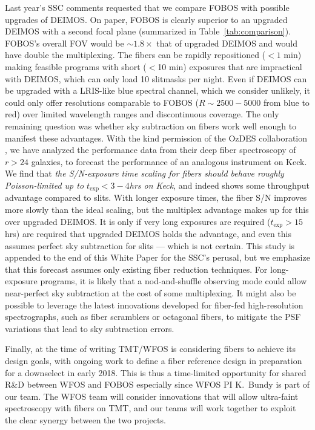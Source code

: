 \documentclass[10pt,letterpaper]{article}
\newcommand{\texp}{\ensuremath{t_\mathrm{exp}}}
\begin{document}
Last year's SSC comments requested that we compare FOBOS with possible upgrades
of DEIMOS. 
On paper, FOBOS is clearly superior to an upgraded DEIMOS with a second focal plane (summarized in Table~\ref{tab:comparison}).
FOBOS's overall FOV would be $\sim 1.8\times$ that of upgraded DEIMOS and would have double the
multiplexing. 
The fibers can be rapidly repositioned ($<1$ min) making feasible programs with short ($<$10 min) 
exposures that are impractical with DEIMOS, which can only load 10 slitmasks per night. 
Even if DEIMOS can be upgraded with a LRIS-like blue spectral channel, which we consider unlikely, 
it could only offer resolutions comparable to FOBOS 
($R\sim 2500-5000$ from blue to red) over limited wavelength ranges and discontinuous coverage.
The only remaining question was whether sky subtraction on fibers work well enough
 to manifest these advantages. With the kind permission of the OzDES collaboration \cite{yuan:2015}, we have analyzed the
 performance data from their deep fiber spectroscopy of $r>24$ galaxies, to forecast the performance of an analogous 
 instrument on Keck. We find that \emph{the S/N-exposure time scaling for fibers should behave roughly Poisson-limited up to 
 $\texp < 3-4$hrs on Keck}, and indeed 
 shows some throughput advantage compared to slits. 
 With longer exposure times, the fiber S/N improves more slowly than the ideal scaling, 
 but the multiplex advantage makes up for this over upgraded DEIMOS. 
 It is only if very long exposures are required ($\texp>15$hrs) are required that upgraded DEIMOS
 holds the advantage, and even this assumes perfect sky subtraction for slits --- which is not certain. 
This study is
 appended to the end of this White Paper for the SSC's perusal, but we emphasize that this forecast 
 assumes only existing fiber reduction techniques. For long-exposure programs, 
 it is likely that a nod-and-shuffle observing mode
 could allow near-perfect sky subtraction at the cost of some multiplexing. It might also be possible to
  leverage the latest innovations developed for fiber-fed high-resolution spectrographs, 
  such as fiber scramblers or octagonal fibers, to mitigate the PSF variations that lead to sky subtraction errors. 
  
Finally, at the time of writing TMT/WFOS is considering
fibers to achieve its design goals, with ongoing work to define a fiber reference design in preparation for a downselect 
in early 2018. This is thus a time-limited opportunity for shared R\&D between WFOS and FOBOS
especially since WFOS PI K.\ Bundy is part of our team.
The WFOS team will consider innovations
that will allow ultra-faint spectroscopy with fibers on TMT, and our teams will work together to exploit the clear
synergy between the two projects.
\end{document}
